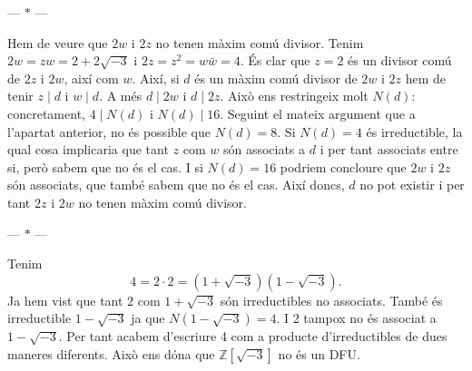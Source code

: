 \documentclass[12pt]{article}
\newcommand{\Z}{\mathbb{Z}}
\newcommand{\R}{\Z[\sqrt{-3}]}
\newcommand{\parbreak}{
	\begin{center}
		--- $\ast$ ---
	\end{center} 
}
\begin{document}
\parbreak

Hem de veure que \( 2w \) i \( 2z \) no tenen màxim comú divisor. Tenim \( 2w = zw = 2 + 2\sqrt{-3} \) i \( 2z = z^2 = w\bar{w} = 4 \). És clar que \( z = 2 \) és un divisor comú de \( 2z \) i \( 2w \), així com \( w \). Així, si \( d \) és un màxim comú divisor de \( 2w \) i \( 2z \) hem de tenir \( z \mid d \) i \( w \mid d \). A més \( d \mid 2w \) i \( d \mid 2z \). Això ens restringeix molt \( N(d) \): concretament, \( 4 \mid N(d) \) i \( N(d) \mid 16 \). Seguint el mateix argument que a l'apartat anterior, no és possible que \( N(d) = 8 \). Si \( N(d) = 4 \) és irreductible, la qual cosa implicaria que tant \( z \) com \( w \) són associats a \( d \) i per tant associats entre si, però sabem que no és el cas. I si \( N(d) = 16 \) podriem concloure que \( 2w \) i \( 2z \) són associats, que també sabem que no és el cas. Així doncs, \( d \) no pot existir i per tant \( 2z \) i \( 2w \) no tenen màxim comú divisor.   



\parbreak

Tenim 
\begin{equation*}
	4 = 2 \cdot 2 = (1 + \sqrt{-3})(1 - \sqrt{-3}).
\end{equation*}
Ja hem vist que tant \( 2 \) com \( 1 + \sqrt{-3} \) són irreductibles no associats. També és irreductible \( 1 - \sqrt{-3} \) ja que \( N(1 - \sqrt{-3}) = 4 \). I 2 tampox no és associat a \( 1 - \sqrt{-3} \). Per tant acabem d'escriure 4 com a producte d'irreductibles de dues maneres diferents. Això ens dóna que \( \R \) no és un DFU.    
\end{document}
